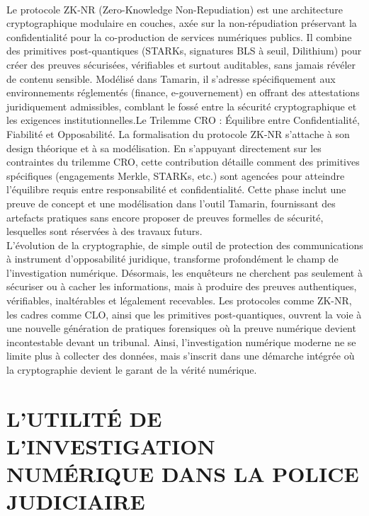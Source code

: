 \documentclass[]{article}
\begin{document}
\paragraph{}
Le protocole ZK-NR (Zero-Knowledge Non-Repudiation) est une architecture cryptographique modulaire en couches, axée sur la non-répudiation préservant la confidentialité pour la co-production de services numériques publics. Il combine des primitives post-quantiques (STARKs, signatures BLS à seuil, Dilithium) pour créer des preuves sécurisées, vérifiables et surtout auditables, sans jamais révéler de contenu sensible. Modélisé dans Tamarin, il s’adresse spécifiquement aux environnements réglementés (finance, e-gouvernement) en offrant des attestations juridiquement admissibles, comblant le fossé entre la sécurité cryptographique et les exigences institutionnelles.Le Trilemme CRO : Équilibre entre Confidentialité, Fiabilité et Opposabilité. La formalisation du protocole ZK-NR s’attache à son design théorique et à sa modélisation. En s’appuyant directement sur les contraintes du trilemme CRO, cette contribution détaille comment des primitives spécifiques (engagements Merkle, STARKs, etc.) sont agencées pour atteindre l’équilibre requis entre responsabilité et confidentialité. Cette phase inclut une preuve de concept et une modélisation dans l’outil Tamarin, fournissant des artefacts pratiques sans encore proposer de preuves formelles de sécurité, lesquelles sont réservées à des travaux futurs.\\
L’évolution de la cryptographie, de simple outil de protection des communications à instrument d’opposabilité juridique, transforme profondément le champ de l’investigation numérique. Désormais, les enquêteurs ne cherchent pas seulement à sécuriser ou à cacher les informations, mais à produire des preuves authentiques, vérifiables, inaltérables et légalement recevables. Les protocoles comme ZK-NR, les cadres comme CLO, ainsi que les primitives post-quantiques, ouvrent la voie à une nouvelle génération de pratiques forensiques où la preuve numérique devient incontestable devant un tribunal. Ainsi, l’investigation numérique moderne ne se limite plus à collecter des données, mais s’inscrit dans une démarche intégrée où la cryptographie devient le garant de la vérité numérique.

\section{L’UTILITÉ DE L’INVESTIGATION NUMÉRIQUE DANS LA POLICE JUDICIAIRE}
\end{document}

